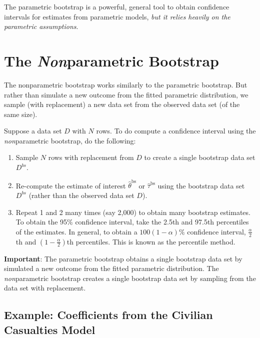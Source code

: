\documentclass[
]{book}
\providecommand{\tightlist}{%
  \setlength{\itemsep}{0pt}\setlength{\parskip}{0pt}}
\begin{document}
The parametric bootstrap is a powerful, general tool to obtain confidence intervals for estimates from parametric models, \emph{but it relies heavily on the parametric assumptions}.

\hypertarget{the-nonparametric-bootstrap}{%
\section{\texorpdfstring{The \emph{Non}parametric Bootstrap}{The Nonparametric Bootstrap}}\label{the-nonparametric-bootstrap}}

The nonparametric bootstrap works similarly to the parametric bootstrap. But rather than simulate a new outcome from the fitted parametric distribution, we sample (with replacement) a new data set from the observed data set (of the same size).

Suppose a data set \(D\) with \(N\) rows. To do compute a confidence interval using the \emph{non}parametric bootstrap, do the following:

\begin{enumerate}
\def\labelenumi{\arabic{enumi}.}
\tightlist
\item
  Sample \(N\) rows with replacement from \(D\) to create a single bootstrap data set \(D^{bs}\).
\item
  Re-compute the estimate of interest \(\hat{\theta}^{\text{bs}}\) or \(\hat{\tau}^{\text{bs}}\) using the bootstrap data set \(D^{bs}\) (rather than the observed data set \(D\)).
\item
  Repeat 1 and 2 many times (say 2,000) to obtain many bootstrap estimates. To obtain the 95\% confidence interval, take the 2.5th and 97.5th percentiles of the estimates. In general, to obtain a \(100(1 - \alpha)\%\) confidence interval, \(\frac{\alpha}{2}\)th and \((1 - \frac{\alpha}{2})\)th percentiles. This is known as the percentile method.
\end{enumerate}

\textbf{Important}: The parametric bootstrap obtains a single bootstrap data set by simulated a new outcome from the fitted parametric distribution. The \emph{non}parametric bootstrap creates a single bootstrap data set by sampling from the data set with replacement.

\hypertarget{example-coefficients-from-the-civilian-casualties-model}{%
\subsection{Example: Coefficients from the Civilian Casualties Model}\label{example-coefficients-from-the-civilian-casualties-model}}
\end{document}
